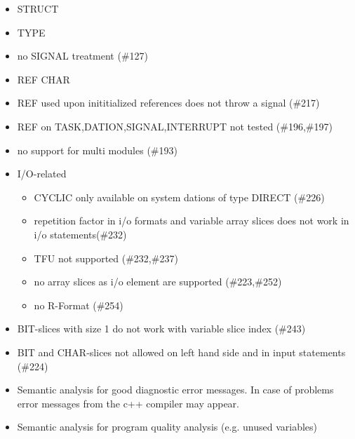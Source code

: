 \documentclass[10pt]{scrbook}
\begin{document}
\begin{itemize}
\item STRUCT
\item TYPE
\item no SIGNAL treatment (\#127)
\item REF CHAR
\item REF used upon inititialized references does not throw a signal (\#217)
\item REF on TASK,DATION,SIGNAL,INTERRUPT not tested (\#196,\#197)
\item no support for multi modules (\#193)
\item I/O-related
   \begin{itemize}
   \item CYCLIC only available on system dations of type DIRECT (\#226)
   \item repetition factor in i/o formats and variable array slices 
      does not work in i/o statements(\#232)
   \item TFU not supported (\#232,\#237)
   \item no array slices as i/o element are supported (\#223,\#252)
   \item no R-Format (\#254)
   \end{itemize}
\item BIT-slices with size 1 do not work with variable slice index (\#243)
\item BIT and CHAR-slices not allowed on left hand side and in input statements
    (\#224)

\item Semantic analysis for good diagnostic error messages.
     In case of problems error messages from the c++ compiler may appear. 
\item Semantic analysis for program quality analysis (e.g. unused variables)
\end{itemize}
\end{document}
